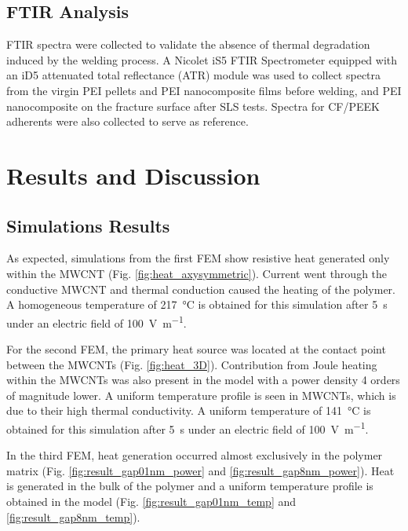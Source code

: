 \documentclass[11pt,review,times]{elsarticle}
\begin{document}
\subsection{FTIR Analysis}

FTIR spectra were collected to validate the absence of thermal degradation induced by the welding process. 
A Nicolet iS5 FTIR Spectrometer equipped with an iD5 attenuated total reflectance (ATR) module was used to collect spectra from the virgin PEI pellets and PEI nanocomposite films before welding, and PEI nanocomposite on the fracture surface after SLS tests. 
Spectra for CF/PEEK adherents were also collected to serve as reference.  

\FloatBarrier
							\section{Results and Discussion}

\subsection{Simulations Results}

As expected, simulations from the first FEM show resistive heat generated only within the MWCNT (Fig. \ref{fig:heat_axysymmetric}). 
Current went through the conductive MWCNT and thermal conduction caused the heating of the polymer. 
A homogeneous temperature of \SI{217}{\celsius} is obtained for this simulation after \SI{5}{\second} under an electric field of \SI{100}{\volt\per\metre}. 

For the second FEM, the primary heat source was located at the contact point between the MWCNTs (Fig. \ref{fig:heat_3D}). 
Contribution from Joule heating within the MWCNTs was also present in the model with a power density 4 orders of magnitude lower. 
A uniform temperature profile is seen in MWCNTs, which is due to their high thermal conductivity. 
A uniform temperature of \SI{141}{\celsius} is obtained for this simulation after \SI{5}{\second} under an electric field of \SI{100}{\volt\per\metre}. 


In the third FEM, heat generation occurred almost exclusively in the polymer matrix (Fig. \ref{fig:result_gap01nm_power} and \ref{fig:result_gap8nm_power}). 
Heat is generated in the bulk of the polymer and a uniform temperature profile is obtained in the model (Fig. \ref{fig:result_gap01nm_temp} and \ref{fig:result_gap8nm_temp}). 
\end{document}
